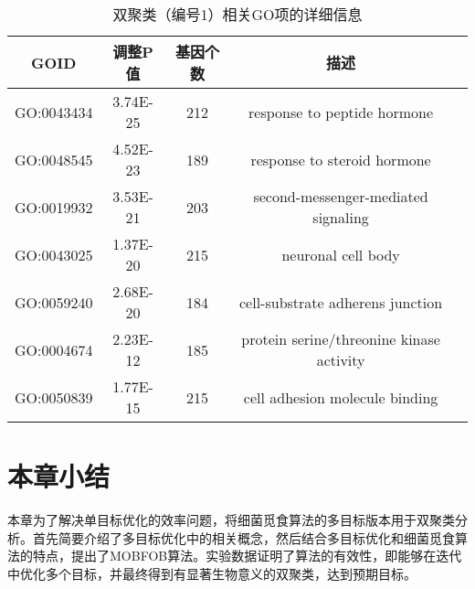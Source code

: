     \begin{table}[htbp]
        \caption{双聚类（编号1）相关GO项的详细信息}\label{tab:go_term}
        \vspace{0.5em}\centering\wuhao
        \begin{tabular}{ccccc}
        \toprule[1.5pt]
        GOID & 调整P值 &  基因个数 & 描述\\
        \midrule[1pt]
        GO:0043434  &3.74E-25& 212& response to peptide hormone \\
        GO:0048545  &4.52E-23& 189& response to steroid hormone \\
        GO:0019932  &3.53E-21& 203& second-messenger-mediated signaling \\
        GO:0043025  &1.37E-20& 215& neuronal cell body \\
        GO:0059240  &2.68E-20& 184& cell-substrate adherens junction \\
        GO:0004674  &2.23E-12& 185& protein serine/threonine kinase activity \\
        GO:0050839  &1.77E-15& 215& cell adhesion molecule binding \\
        \bottomrule[1.5pt]
        \end{tabular}
    \end{table}

\section{本章小结}
本章为了解决单目标优化的效率问题，将细菌觅食算法的多目标版本用于双聚类分析。首先简要介绍了多目标优化中的相关概念，然后结合多目标优化和细菌觅食算法的特点，提出了MOBFOB算法。实验数据证明了算法的有效性，即能够在迭代中优化多个目标，并最终得到有显著生物意义的双聚类，达到预期目标。